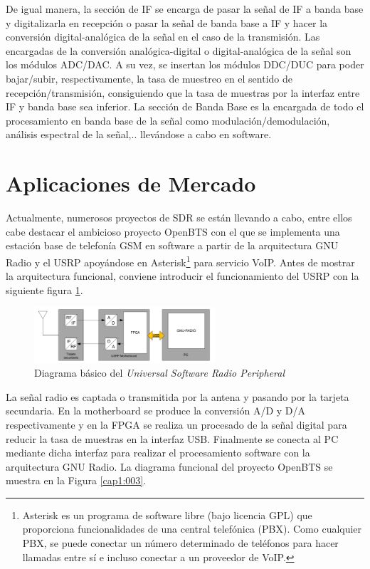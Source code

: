 De igual manera, la sección de IF se encarga de pasar la señal de IF a banda base y digitalizarla en recepción o pasar la señal de banda base a IF y hacer la conversión digital-analógica de la señal en el caso de la transmisión. Las encargadas de la conversión analógica-digital o digital-analógica de la señal son los módulos ADC/DAC. A su vez, se insertan los módulos DDC/DUC para poder bajar/subir, respectivamente, la tasa de muestreo en el sentido de recepción/transmisión, consiguiendo que la tasa de muestras por la interfaz entre IF y banda base sea inferior.
La sección de Banda Base es la encargada de todo el procesamiento en banda base de la señal como modulación/demodulación, análisis espectral de la señal,.. llevándose a cabo en software.

\section{Aplicaciones de Mercado}

Actualmente, numerosos proyectos de SDR se están llevando a cabo, entre ellos cabe
destacar el ambicioso proyecto OpenBTS con el que se implementa una estación base de
telefonía GSM en software a partir de la arquitectura GNU Radio y el USRP apoyándose en
Asterisk\footnote{Asterisk es un programa de software libre (bajo licencia GPL) que proporciona funcionalidades de
una central telefónica (PBX). Como cualquier PBX, se puede conectar un número determinado
de teléfonos para hacer llamadas entre sí e incluso conectar a un proveedor de VoIP.}  para servicio VoIP. Antes de mostrar la arquitectura funcional, conviene introducir el funcionamiento del USRP con la siguiente figura \ref{cap1:002}.

\begin{figure}[htb]
\centering
\includegraphics[width=0.6\textwidth]{capitulo1/USRP.png}
\caption{Diagrama básico del \textit{Universal Software Radio Peripheral}}
\label{cap1:002}
\end{figure}

La señal radio es captada o transmitida por la antena y pasando por la tarjeta secundaria. En
la motherboard se produce la conversión A/D y D/A respectivamente y en la FPGA se realiza un
procesado de la señal digital para reducir la tasa de muestras en la interfaz USB. Finalmente se conecta al PC mediante dicha interfaz para realizar el procesamiento software con la arquitectura GNU Radio.
La diagrama funcional del proyecto OpenBTS se muestra en la Figura \ref{cap1:003}.

